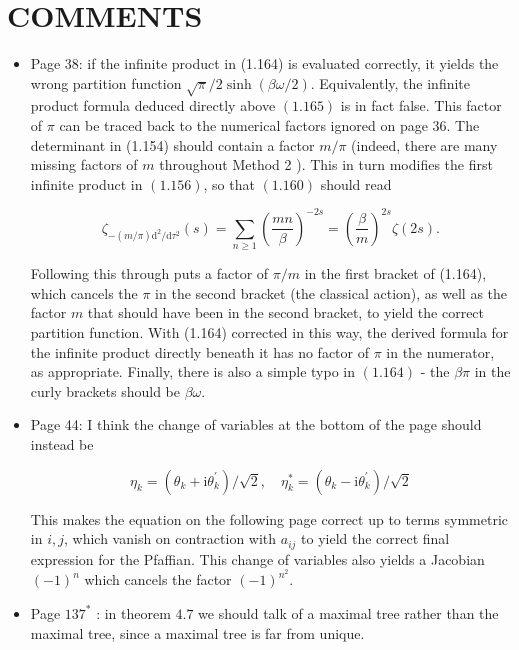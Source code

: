 \documentclass{article}
\begin{document}
\section*{COMMENTS}
\begin{itemize}
  
\item Page 38: if the infinite product in (1.164) is evaluated correctly, it yields the wrong partition function $\sqrt{\pi} / 2 \sinh (\beta \omega / 2)$. Equivalently, the infinite product formula deduced directly above $(1.165)$ is in fact false. This factor of $\pi$ can be traced back to the numerical factors ignored on page 36. The determinant in (1.154) should contain a factor $m / \pi$ (indeed, there are many missing factors of $m$ throughout Method 2 ). This in turn modifies the first infinite product in $(1.156)$, so that $(1.160)$ should read

\[\zeta_{-(m/\pi)\mathrm{d}^2/\mathrm{d}\tau^2}(s) = \sum_{n \geq 1} \left(\frac{mn}{\beta}\right)^{-2s} = \left(\frac{\beta}{m}\right)^{2s}\zeta(2s).\]

Following this through puts a factor of $\pi / m$ in the first bracket of (1.164), which cancels the $\pi$ in the second bracket (the classical action), as well as the factor $m$ that should have been in the second bracket, to yield the correct partition function. With (1.164) corrected in this way, the derived formula for the infinite product directly beneath it has no factor of $\pi$ in the numerator, as appropriate. Finally, there is also a simple typo in $(1.164)$ - the $\beta \pi$ in the curly brackets should be $\beta \omega$.

\item Page 44: I think the change of variables at the bottom of the page should instead be

$$
\eta_{k}=\left(\theta_{k}+\mathrm{i} \theta_{k}^{\prime}\right) / \sqrt{2}, \quad \eta_{k}^{*}=\left(\theta_{k}-\mathrm{i} \theta_{k}^{\prime}\right) / \sqrt{2}
$$

This makes the equation on the following page correct up to terms symmetric in $i, j$, which vanish on contraction with $a_{i j}$ to yield the correct final expression for the Pfaffian. This change of variables also yields a Jacobian $(-1)^{n}$ which cancels the factor $(-1)^{n^{2}}$.

\item Page $137^{*}$ : in theorem $4.7$ we should talk of a maximal tree rather than the maximal tree, since a maximal tree is far from unique.


\end{itemize}
\end{document}
